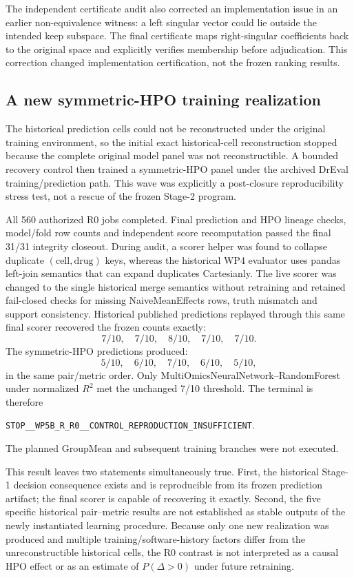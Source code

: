 \documentclass[11pt]{article}
\begin{document}
The independent certificate audit also corrected an implementation issue in an earlier non-equivalence witness: a left singular vector could lie outside the intended keep subspace. The final certificate maps right-singular coefficients back to the original space and explicitly verifies membership before adjudication. This correction changed implementation certification, not the frozen ranking results.


\subsection{A new symmetric-HPO training realization}
The historical prediction cells could not be reconstructed under the original training environment, so the initial exact historical-cell reconstruction stopped because the complete original model panel was not reconstructible. A bounded recovery control then trained a symmetric-HPO panel under the archived DrEval training/prediction path. This wave was explicitly a post-closure reproducibility stress test, not a rescue of the frozen Stage-2 program.

All 560 authorized R0 jobs completed. Final prediction and HPO lineage checks, model/fold row counts and independent score recomputation passed the final 31/31 integrity closeout. During audit, a scorer helper was found to collapse duplicate $(\mathrm{cell},\mathrm{drug})$ keys, whereas the historical WP4 evaluator uses pandas left-join semantics that can expand duplicates Cartesianly. The live scorer was changed to the single historical merge semantics without retraining and retained fail-closed checks for missing NaiveMeanEffects rows, truth mismatch and support consistency. Historical published predictions replayed through this same final scorer recovered the frozen counts exactly:
\[
7/10,\quad 7/10,\quad 8/10,\quad 7/10,\quad 7/10.
\]
The symmetric-HPO predictions produced:
\[
5/10,\quad 6/10,\quad 7/10,\quad 6/10,\quad 5/10,
\]
in the same pair/metric order. Only MultiOmicsNeuralNetwork--RandomForest under normalized $R^2$ met the unchanged 7/10 threshold. The terminal is therefore
\begin{center}
\texttt{STOP\_\_WP5B\_R\_R0\_\_CONTROL\_REPRODUCTION\_INSUFFICIENT}.
\end{center}
The planned GroupMean and subsequent training branches were not executed.

This result leaves two statements simultaneously true. First, the historical Stage-1 decision consequence exists and is reproducible from its frozen prediction artifact; the final scorer is capable of recovering it exactly. Second, the five specific historical pair--metric results are not established as stable outputs of the newly instantiated learning procedure. Because only one new realization was produced and multiple training/software-history factors differ from the unreconstructible historical cells, the R0 contrast is not interpreted as a causal HPO effect or as an estimate of $P(\Delta>0)$ under future retraining.
\end{document}
